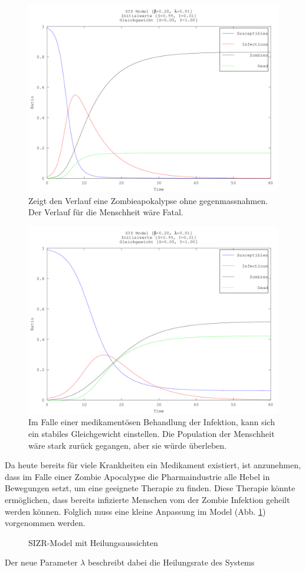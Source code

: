 \begin{refsection}
\begin{figure}[p]
	\centering
	\includegraphics[width=.7\textwidth]{sir/images/Zombies_nicht_heilbar}
  \caption[Zombie Apokalypse]{Zeigt den Verlauf eine Zombieapokalypse ohne gegenmassnahmen. Der Verlauf für die Menschheit wäre Fatal.}
\end{figure}

\begin{figure}[p]
	\centering
	\includegraphics[width=.7\textwidth]{sir/images/Zombies}
  \caption[Zombies]{Im Falle einer medikamentösen Behandlung der Infektion, kann sich ein stabiles Gleichgewicht einstellen. Die Population der Menschheit wäre stark zurück gegangen, aber sie würde überleben.}
\end{figure}

Da heute bereits für viele Krankheiten ein Medikament existiert, ist anzunehmen, dass im Falle einer Zombie Apocalypse die Pharmaindustrie alle Hebel in Bewegungen setzt, um eine geeignete Therapie zu finden. Diese Therapie könnte ermöglichen, dass bereits infizierte Menschen vom der Zombie Infektion geheilt werden können. Folglich muss eine kleine Anpassung im Model (Abb. \ref{fig:zombie_healing}) vorgenommen werden. 
\begin{figure}[ht]
  \centering
  
  \caption{SIZR-Model mit Heilungsaussichten}
  \label{fig:zombie_healing}
\end{figure}
Der neue Parameter $\lambda$ beschreibt dabei die Heilungsrate des Systems


\end{refsection}
